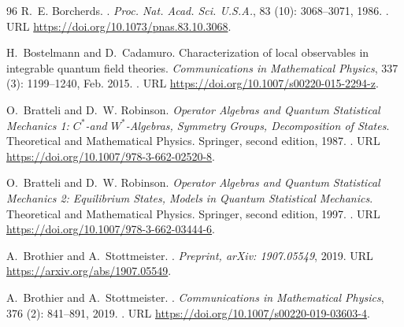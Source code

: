 \documentclass[a4paper, 11pt]{article}
\DeclareMathOperator{\1}{\mathds{1}}
\begin{document}
\begin{thebibliography}{96}
R.~E. Borcherds.
.
\newblock \emph{Proc. Nat. Acad. Sci. U.S.A.}, 83 (10):
  3068--3071, 1986.
\newblock {}.
\newblock URL \url{https://doi.org/10.1073/pnas.83.10.3068}.

H.~Bostelmann and D.~Cadamuro.
\newblock Characterization of local observables in integrable quantum field
  theories.
\newblock \emph{Communications in Mathematical Physics}, 337
  (3): 1199--1240, Feb. 2015.
\newblock {}.
\newblock URL \url{https://doi.org/10.1007/s00220-015-2294-z}.

O.~{B}ratteli and D.~W. {R}obinson.
\newblock \emph{{O}perator {A}lgebras and {Q}uantum {S}tatistical {M}echanics
  1: ${C}^{*}$-and ${W}^{*}$-{A}lgebras, {S}ymmetry {G}roups, {D}ecomposition
  of {S}tates}.
\newblock Theoretical and Mathematical Physics. {S}pringer, second edition,
  1987.
\newblock {}.
\newblock URL \url{https://doi.org/10.1007/978-3-662-02520-8}.

O.~{B}ratteli and D.~W. {R}obinson.
\newblock \emph{{O}perator {A}lgebras and {Q}uantum {S}tatistical {M}echanics
  2: {E}quilibrium {S}tates, {M}odels in {Q}uantum {S}tatistical {M}echanics}.
\newblock Theoretical and Mathematical Physics. {S}pringer, second edition,
  1997.
\newblock {}.
\newblock URL \url{https://doi.org/10.1007/978-3-662-03444-6}.

A.~Brothier and A.~Stottmeister.
.
\newblock \emph{Preprint, arXiv: 1907.05549}, 2019{}.
\newblock URL \url{https://arxiv.org/abs/1907.05549}.

A.~Brothier and A.~Stottmeister.
.
\newblock \emph{Communications in Mathematical Physics}, 376
  (2): 841--891, 2019{}.
\newblock {}.
\newblock URL \url{https://doi.org/10.1007/s00220-019-03603-4}.


\end{thebibliography}
\end{document}

